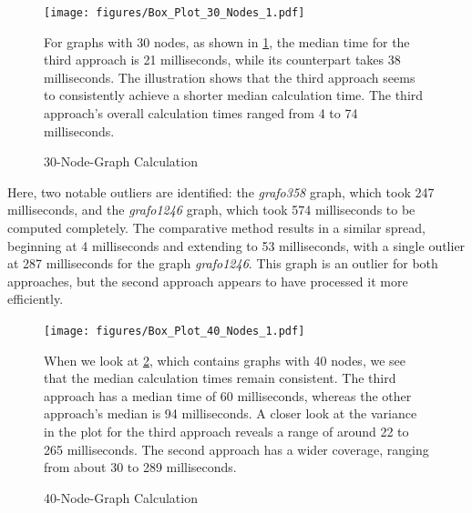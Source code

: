 \documentclass[bachelor, english]{algothesis}
\begin{document}
\begin{figure}[ht]
  \centering
  \begin{minipage}{0.5\textwidth}
        \hspace{-1.3cm}
        \texttt{[image: figures/Box\_Plot\_30\_Nodes\_1.pdf]} 
  \caption{30-Node-Graph Calculation}
  \label{fig:Calc_30_Nodes}
  \end{minipage}%
  \begin{minipage}{0.45\textwidth}
  \vspace{-1cm}
  For graphs with 30 nodes, as shown in \cref{fig:Calc_30_Nodes}, the median time for the third approach is 21 milliseconds, while its counterpart takes 38 milliseconds. The illustration shows that the third approach seems to consistently achieve a shorter median calculation time. The third approach's overall calculation times ranged from 4 to 74 milliseconds. 
  \end{minipage}
\end{figure}
\noindent
Here, two notable outliers are identified: the \textit{grafo358} graph, which took 247 milliseconds, and the \textit{grafo1246} graph, which took 574 milliseconds to be computed completely. The comparative method results in a similar spread, beginning at 4 milliseconds and extending to 53 milliseconds, with a single outlier at 287 milliseconds for the graph \textit{grafo1246}. This graph is an outlier for both approaches, but the second approach appears to have processed it more efficiently. 
\noindent
\begin{figure}[ht]
  \centering
  \begin{minipage}{0.5\textwidth}
        \hspace{-1.3cm}
        \texttt{[image: figures/Box\_Plot\_40\_Nodes\_1.pdf]} 
  \caption{40-Node-Graph Calculation}
  \label{fig:Calc_40_Nodes}
  \end{minipage}%
  \begin{minipage}{0.45\textwidth}
  \vspace{-0.2cm}
  When we look at \cref{fig:Calc_40_Nodes}, which contains graphs with 40 nodes, we see that the median calculation times remain consistent. The third approach has a median time of 60 milliseconds, whereas the other approach's median is 94 milliseconds. A closer look at the variance in the plot for the third approach reveals a range of around 22 to 265 milliseconds. The second approach has a wider coverage, ranging from about 30 to 289 milliseconds.
  \end{minipage}
\end{figure}
\end{document}

